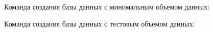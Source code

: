 \documentclass[letterpaper,10pt,russian]{sphinxmanual}
\begin{document}
\sphinxAtStartPar
Команда создания базы данных с минимальным объемом данных:

\begin{sphinxVerbatim}[commandchars=\\\{\}]
    \PYG{p}{[}  \PYG{p}{]}
\end{sphinxVerbatim}

\sphinxAtStartPar
Команда создания базы данных с тестовым объемом данных:

\begin{sphinxVerbatim}[commandchars=\\\{\}]
    \PYG{p}{[}  \PYG{p}{]}
\end{sphinxVerbatim}
\end{document}
